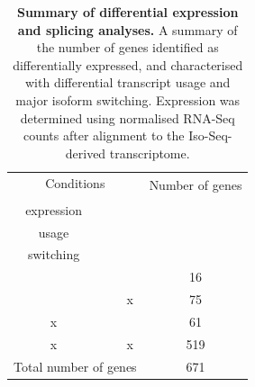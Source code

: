 \vspace{0.2cm}
\begin{table}[!htp]
	\centering
	\captionsetup{width=0.95\textwidth,singlelinecheck=off}
	\setlength\tabcolsep{6pt} %
	\caption[Summary of differential expression and splicing analyses]%
	{\textbf{Summary of differential expression and splicing analyses.} A summary of the number of genes identified as differentially expressed, and characterised with differential transcript usage and major isoform switching. Expression was determined using normalised RNA-Seq counts after alignment to the Iso-Seq-derived transcriptome.}
	\begin{tabularx}{0.92\textwidth}{cccc}
		\toprule
		\multicolumn{3}{c}{Conditions}                                                                                                                                                                                       & \multirow{2}{*}{Number of genes} \\ \cmidrule(r){1-3}
		\begin{tabular}[c]{@{}c@{}}Differential gene\\  expression\end{tabular} & \begin{tabular}[c]{@{}c@{}}Differential transcript \\ usage\end{tabular} & \begin{tabular}[c]{@{}c@{}}Major isoform\\  switching\end{tabular} &                                  \\ \midrule
		\checkmark  & \checkmark          & \checkmark                                                                & 16                               \\
		\checkmark                                                                      & \checkmark                                                                    & x                                                                  & 75                               \\
		x                                                                       & \checkmark                                                                    & \checkmark                                                                 & 61                               \\
		x                                                                       & \checkmark                                                                    & x                                                                  & 519                              \\ \midrule
		\multicolumn{3}{c}{Total number of genes}                                                                                                                                                                            & 671                              \\ \bottomrule
	\end{tabularx}
	\label{tab:DIU_DEA_nums}
\end{table}


